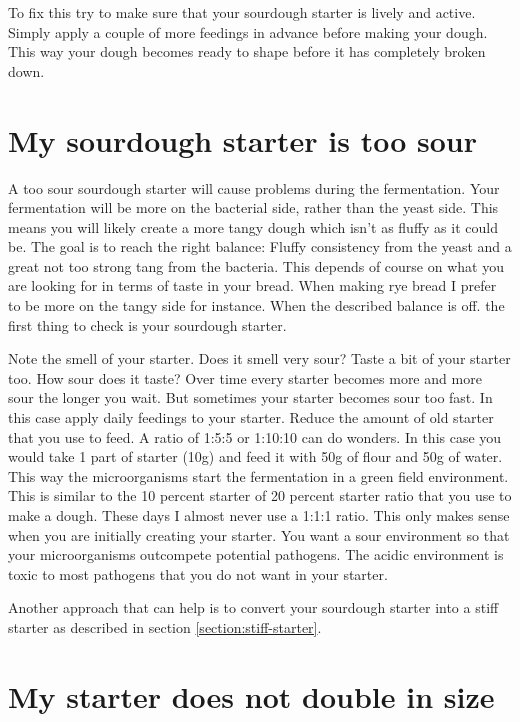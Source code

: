 To fix this try to make sure that your sourdough starter is lively
and active. Simply apply a couple of more feedings in advance before
making your dough. This way your dough becomes ready to shape
before it has completely broken down.

\section{My sourdough starter is too sour}

A too sour sourdough starter will cause problems during
the fermentation. Your fermentation will be more on the
bacterial side, rather than the yeast side. This means
you will likely create a more tangy dough which isn't
as fluffy as it could be. The goal is to reach the right
balance: Fluffy consistency from the yeast and a great
not too strong tang from the bacteria. This depends
of course on what you are looking for in terms of taste
in your bread. When making rye bread I prefer to be more
on the tangy side for instance. When the described balance
is off. the first thing to check is your sourdough starter.

Note the smell of your starter. Does it smell very sour?
Taste a bit of your starter too. How sour does it taste?
Over time every starter becomes more and more sour the longer
you wait. But sometimes your starter becomes sour too fast.
In this case apply daily feedings to your starter. Reduce
the amount of old starter that you use to feed. A ratio
of 1:5:5 or 1:10:10 can do wonders. In this case you would
take 1 part of starter (10g) and feed it with 50g of flour
and 50g of water. This way the microorganisms start
the fermentation in a green field environment. This is
similar to the 10 percent starter of 20 percent starter
ratio that you use to make a dough. These days I almost
never use a 1:1:1 ratio. This only makes sense when you
are initially creating your starter. You want a sour
environment so that your microorganisms outcompete
potential pathogens. The acidic environment is toxic
to most pathogens that you do not want in your starter.

Another approach that can help is to convert your
sourdough starter into a stiff starter as
described in section \ref{section:stiff-starter}.

\section{My starter does not double in size}


